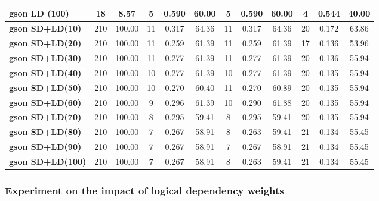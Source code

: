 \documentclass{ieeeaccess}
\begin{document}
\begin{table}[htbp]
\begin{tabular}{|l|c|c|ccc|ccc|ccc|}
\textbf{gson LD (100)} & 18 & 8.57 & 5 & 0.590 & 60.00 & 5 & 0.590 & 60.00 & 4 & 0.544 & 40.00 \\
\hline
\textbf{gson SD+LD(10)} & 210 & 100.00 & 11 & \cellcolor[HTML]{fef9e4}0.317 & \cellcolor[HTML]{fef9e4}64.36 & 11 & \cellcolor[HTML]{fef9e4}0.317 & \cellcolor[HTML]{fef9e4}64.36 & 20 & \cellcolor[HTML]{fef9e4}0.172 & \cellcolor[HTML]{fef9e4}63.86 \\
\textbf{gson SD+LD(20)} & 210 & 100.00 & 11 & 0.259 & 61.39 & 11 & 0.259 & 61.39 & 17 & 0.136 & 53.96 \\
\textbf{gson SD+LD(30)} & 210 & 100.00 & 11 & 0.277 & 61.39 & 11 & 0.277 & 61.39 & 20 & 0.136 & 55.94 \\
\textbf{gson SD+LD(40)} & 210 & 100.00 & 10 & 0.277 & 61.39 & 10 & 0.277 & 61.39 & 20 & 0.135 & 55.94 \\
\textbf{gson SD+LD(50)} & 210 & 100.00 & 10 & 0.270 & 60.40 & 11 & 0.270 & 60.89 & 20 & 0.135 & 55.94 \\
\textbf{gson SD+LD(60)} & 210 & 100.00 & 9 & 0.296 & 61.39 & 10 & 0.290 & 61.88 & 20 & 0.135 & 55.94 \\
\textbf{gson SD+LD(70)} & 210 & 100.00 & 8 & 0.295 & 59.41 & 8 & 0.295 & 59.41 & 20 & 0.135 & 55.94 \\
\textbf{gson SD+LD(80)} & 210 & 100.00 & 7 & 0.267 & 58.91 & 8 & 0.263 & 59.41 & 21 & 0.134 & 55.45 \\
\textbf{gson SD+LD(90)} & 210 & 100.00 & 7 & 0.267 & 58.91 & 7 & 0.267 & 58.91 & 21 & 0.134 & 55.45 \\
\textbf{gson SD+LD(100)} & 210 & 100.00 & 7 & 0.267 & 58.91 & 8 & 0.263 & 59.41 & 21 & 0.134 & 55.45 \\
\hline
\end{tabular}
\end{table}





\subsubsection{Experiment on the impact of logical dependency weights}
\end{document}
